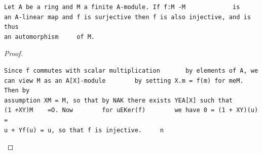 \begin{theorem}\label{mcrt-auto-theorem-2-4}\uses{}
\begin{verbatim}
Let A be a ring and M a finite A-module. If f:M -M             is
an A-linear map and f is surjective then f is also injective, and is thus
an automorphism     of M.
\end{verbatim}
\end{theorem}
\begin{proof}
\begin{verbatim}
Since f commutes with scalar multiplication       by elements of A, we
can view M as an A[X]-module        by setting X.m = f(m) for meM. Then by
assumption XM = M, so that by NAK there exists YEA[X] such that
(1 +XY)M    =O. Now        for uEKer(f)        we have 0 = (1 + XY)(u) =
u + Yf(u) = u, so that f is injective.     n
\end{verbatim}
\end{proof}


